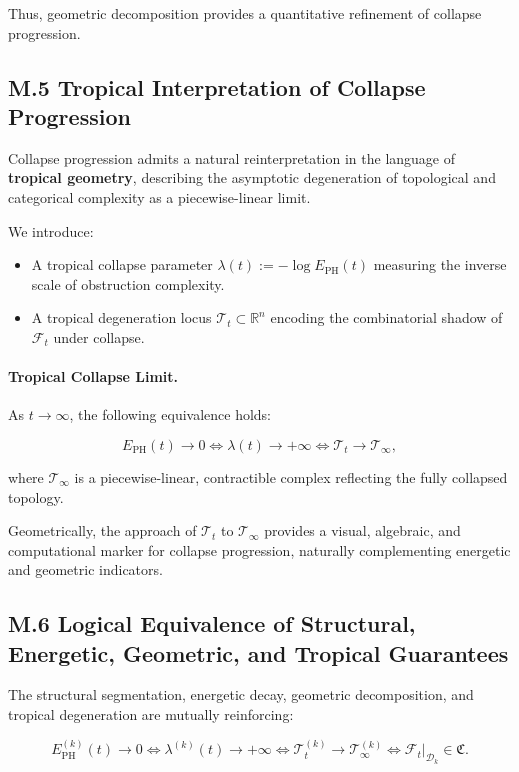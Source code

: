 \documentclass[11pt]{article}
\begin{document}
Thus, geometric decomposition provides a quantitative refinement of collapse progression.

\subsection*{M.5 Tropical Interpretation of Collapse Progression}

Collapse progression admits a natural reinterpretation in the language of \textbf{tropical geometry}, describing the asymptotic degeneration of topological and categorical complexity as a piecewise-linear limit.

We introduce:

\begin{itemize}
  \item A tropical collapse parameter $\lambda(t) := -\log E_{\mathrm{PH}}(t)$ measuring the inverse scale of obstruction complexity.
  \item A tropical degeneration locus $\mathcal{T}_t \subset \mathbb{R}^n$ encoding the combinatorial shadow of $\mathcal{F}_t$ under collapse.
\end{itemize}

\paragraph{Tropical Collapse Limit.}  
As $t \to \infty$, the following equivalence holds:

\[
E_{\mathrm{PH}}(t) \to 0 \iff \lambda(t) \to +\infty \iff \mathcal{T}_t \to \mathcal{T}_\infty,
\]

where $\mathcal{T}_\infty$ is a piecewise-linear, contractible complex reflecting the fully collapsed topology.

Geometrically, the approach of $\mathcal{T}_t$ to $\mathcal{T}_\infty$ provides a visual, algebraic, and computational marker for collapse progression, naturally complementing energetic and geometric indicators.

\subsection*{M.6 Logical Equivalence of Structural, Energetic, Geometric, and Tropical Guarantees}

The structural segmentation, energetic decay, geometric decomposition, and tropical degeneration are mutually reinforcing:

\[
E_{\mathrm{PH}}^{(k)}(t) \to 0 \iff \lambda^{(k)}(t) \to +\infty \iff \mathcal{T}_t^{(k)} \to \mathcal{T}_\infty^{(k)} \iff \mathcal{F}_t|_{\mathcal{D}_k} \in \mathfrak{C}.
\]
\end{document}
